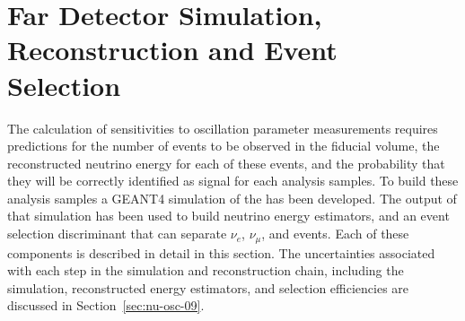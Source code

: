 \section{Far Detector Simulation, Reconstruction and Event Selection}
\label{sec:physics-lbnosc-simreco}


The calculation of  sensitivities to oscillation parameter measurements requires predictions for the number of events to be observed in the  fiducial volume, the reconstructed neutrino energy for each of these events, and the probability that they will be correctly identified as signal for each analysis samples. To build these analysis samples a  GEANT4 simulation of the  has been developed. The output of that simulation has been used to build neutrino energy estimators, and an event selection discriminant that can separate  $\nu_{e}$,  $\nu_{\mu}$, and  events. Each of these components is described in detail in this section. The uncertainties associated with each step in the simulation and reconstruction chain, including the  simulation, reconstructed energy estimators, and selection efficiencies are discussed in Section~\ref{sec:nu-osc-09}. 


